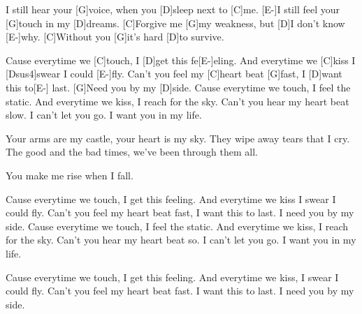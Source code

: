 \begin{guitar}
[E-]I still hear your [G]voice, when you [D]sleep next to [C]me.
[E-]I still feel your [G]touch in my [D]dreams.
[C]Forgive me [G]my weakness, but [D]I don't know [E-]why.
[C]Without you [G]it's hard [D]to survive.


Cause everytime we [C]touch, I [D]get this fe[E-]eling.
And everytime we [C]kiss I [Dsus4]swear I could [E-]fly.
Can't you feel my [C]heart beat [G]fast,
I [D]want this to[E-] last.
[G]Need you by my [D]side.
Cause everytime we touch, I feel the static.
And everytime we kiss, I reach for the sky.
Can't you hear my heart beat slow.
I can't let you go.
I want you in my life.

Your arms are my castle, your heart is my sky.
They wipe away tears that I cry.
The good and the bad times, we've been through them all.

You make me rise when I fall.


Cause everytime we touch, I get this feeling.
And everytime we kiss I swear I could fly.
Can't you feel my heart beat fast, I want this to last.
I need you by my side.
Cause everytime we touch, I feel the static.
And everytime we kiss, I reach for the sky.
Can't you hear my heart beat so.
I can't let you go.
I want you in my life.

Cause everytime we touch, I get this feeling.
And everytime we kiss, I swear I could fly.
Can't you feel my heart beat fast.
I want this to last.
I need you by my side.
  
\end{guitar}
